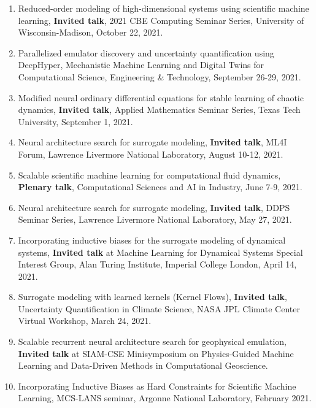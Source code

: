 \documentclass[letterpaper]{article}
\begin{document}
\begin{enumerate}
\item Reduced-order modeling of high-dimensional systems using scientific machine learning, \textbf{Invited talk}, 2021 CBE Computing Seminar Series, University of Wisconsin-Madison, October 22, 2021.

\item Parallelized emulator discovery and uncertainty quantification using DeepHyper, Mechanistic Machine Learning and Digital Twins for Computational Science, Engineering \& Technology, September 26-29, 2021.

\item Modified neural ordinary differential equations for stable learning of chaotic dynamics, \textbf{Invited talk}, Applied Mathematics Seminar Series, Texas Tech University, September 1, 2021.

\item Neural architecture search for surrogate modeling, \textbf{Invited talk}, ML4I Forum, Lawrence Livermore National Laboratory, August 10-12, 2021.

\item Scalable scientific machine learning for computational fluid dynamics, \textbf{Plenary talk}, Computational Sciences and AI in Industry, June 7-9, 2021.

\item Neural architecture search for surrogate modeling, \textbf{Invited talk}, DDPS Seminar Series, Lawrence Livermore National Laboratory, May 27, 2021.

\item Incorporating inductive biases for the surrogate modeling of dynamical systems, \textbf{Invited talk} at Machine Learning for Dynamical Systems Special Interest Group, Alan Turing Institute, Imperial College London, April 14, 2021.

\item Surrogate modeling with learned kernels (Kernel Flows), \textbf{Invited talk}, Uncertainty Quantification in Climate Science, NASA JPL Climate Center Virtual Workshop, March 24, 2021.

\item Scalable recurrent neural architecture search for geophysical emulation, \textbf{Invited talk} at SIAM-CSE Minisymposium on Physics-Guided Machine Learning and Data-Driven Methods in Computational Geoscience.

\item Incorporating Inductive Biases as Hard Constraints for Scientific Machine Learning, MCS-LANS seminar, Argonne National Laboratory, February 2021.


\end{enumerate}
\end{document}
